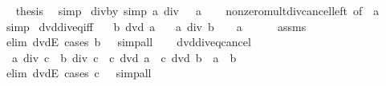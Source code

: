 \begin{isabellebody}
\ \isamarkupfalse%
\ {\isacharquery}{\kern0pt}thesis\ \isamarkupfalse%
\ simp\isanewline
{}\isamarkupfalse%
%
\endisatagproof
{\isafoldproof}%
%
\isadelimproof
\isanewline
%
\endisadelimproof
\isanewline
{}\isamarkupfalse%
\ div{\isacharunderscore}{\kern0pt}by{\isacharunderscore}{\kern0pt}{}\ {\isacharbrackleft}{\kern0pt}simp{\isacharbrackright}{\kern0pt}{\isacharcolon}{\kern0pt}\ {\isachardoublequoteopen}a\ div\ {}\ {\isacharequal}{\kern0pt}\ a{\isachardoublequoteclose}\isanewline
%
\isadelimproof
\ \ %
\endisadelimproof
%
\isatagproof
{}\isamarkupfalse%
\ nonzero{\isacharunderscore}{\kern0pt}mult{\isacharunderscore}{\kern0pt}div{\isacharunderscore}{\kern0pt}cancel{\isacharunderscore}{\kern0pt}left\ {\isacharbrackleft}{\kern0pt}of\ {}\ a{\isacharbrackright}{\kern0pt}\ \isamarkupfalse%
\ simp%
\endisatagproof
{\isafoldproof}%
%
\isadelimproof
\isanewline
%
\endisadelimproof
\isanewline
{}\isamarkupfalse%
\ dvd{\isacharunderscore}{\kern0pt}div{\isacharunderscore}{\kern0pt}eq{\isacharunderscore}{\kern0pt}{}{\isacharunderscore}{\kern0pt}iff{\isacharcolon}{\kern0pt}\isanewline
\ \ \ {\isachardoublequoteopen}b\ dvd\ a{\isachardoublequoteclose}\isanewline
\ \ \ {\isachardoublequoteopen}a\ div\ b\ {\isacharequal}{\kern0pt}\ {}\ {\isasymlongleftrightarrow}\ a\ {\isacharequal}{\kern0pt}\ {}{\isachardoublequoteclose}\isanewline
%
\isadelimproof
\ \ %
\endisadelimproof
%
\isatagproof
{}\isamarkupfalse%
\ assms\ \isamarkupfalse%
\ {\isacharparenleft}{\kern0pt}elim\ dvdE{\isacharcomma}{\kern0pt}\ cases\ {\isachardoublequoteopen}b\ {\isacharequal}{\kern0pt}\ {}{\isachardoublequoteclose}{\isacharparenright}{\kern0pt}\ simp{\isacharunderscore}{\kern0pt}all%
\endisatagproof
{\isafoldproof}%
%
\isadelimproof
\ \ \isanewline
%
\endisadelimproof
\isanewline
{}\isamarkupfalse%
\ dvd{\isacharunderscore}{\kern0pt}div{\isacharunderscore}{\kern0pt}eq{\isacharunderscore}{\kern0pt}cancel{\isacharcolon}{\kern0pt}\isanewline
\ \ {\isachardoublequoteopen}a\ div\ c\ {\isacharequal}{\kern0pt}\ b\ div\ c\ {\isasymLongrightarrow}\ c\ dvd\ a\ {\isasymLongrightarrow}\ c\ dvd\ b\ {\isasymLongrightarrow}\ a\ {\isacharequal}{\kern0pt}\ b{\isachardoublequoteclose}\isanewline
%
\isadelimproof
\ \ %
\endisadelimproof
%
\isatagproof
{}\isamarkupfalse%
\ {\isacharparenleft}{\kern0pt}elim\ dvdE{\isacharcomma}{\kern0pt}\ cases\ {\isachardoublequoteopen}c\ {\isacharequal}{\kern0pt}\ {}{\isachardoublequoteclose}{\isacharparenright}{\kern0pt}\ simp{\isacharunderscore}{\kern0pt}all%

\end{isabellebody}
